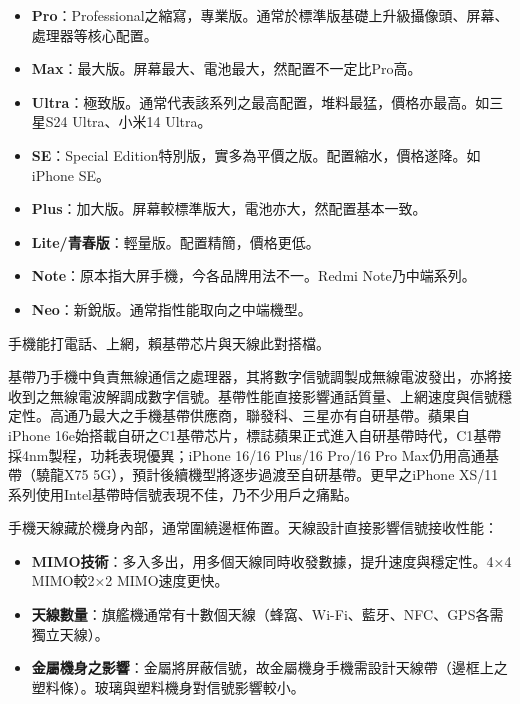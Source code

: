 
\begin{itemize}
  \item \textbf{Pro}：Professional之縮寫，專業版。通常於標準版基礎上升級攝像頭、屏幕、處理器等核心配置。
  \item \textbf{Max}：最大版。屏幕最大、電池最大，然配置不一定比Pro高。
  \item \textbf{Ultra}：極致版。通常代表該系列之最高配置，堆料最猛，價格亦最高。如三星S24 Ultra、小米14 Ultra。
  \item \textbf{SE}：Special Edition特別版，實多為平價之版。配置縮水，價格遂降。如iPhone SE。
  \item \textbf{Plus}：加大版。屏幕較標準版大，電池亦大，然配置基本一致。
  \item \textbf{Lite/青春版}：輕量版。配置精簡，價格更低。
  \item \textbf{Note}：原本指大屏手機，今各品牌用法不一。Redmi Note乃中端系列。
  \item \textbf{Neo}：新銳版。通常指性能取向之中端機型。
\end{itemize}


手機能打電話、上網，賴基帶芯片與天線此對搭檔。


基帶乃手機中負責無線通信之處理器，其將數字信號調製成無線電波發出，亦將接收到之無線電波解調成數字信號。基帶性能直接影響通話質量、上網速度與信號穩定性。高通乃最大之手機基帶供應商，聯發科、三星亦有自研基帶。蘋果自iPhone 16e始搭載自研之C1基帶芯片，標誌蘋果正式進入自研基帶時代，C1基帶採4nm製程，功耗表現優異；iPhone 16/16 Plus/16 Pro/16 Pro Max仍用高通基帶（驍龍X75 5G），預計後續機型將逐步過渡至自研基帶。更早之iPhone XS/11系列使用Intel基帶時信號表現不佳，乃不少用戶之痛點。


手機天線藏於機身內部，通常圍繞邊框佈置。天線設計直接影響信號接收性能：

\begin{itemize}
  \item \textbf{MIMO技術}：多入多出，用多個天線同時收發數據，提升速度與穩定性。4×4 MIMO較2×2 MIMO速度更快。
  \item \textbf{天線數量}：旗艦機通常有十數個天線（蜂窩、Wi-Fi、藍牙、NFC、GPS各需獨立天線）。
  \item \textbf{金屬機身之影響}：金屬將屏蔽信號，故金屬機身手機需設計天線帶（邊框上之塑料條）。玻璃與塑料機身對信號影響較小。
\end{itemize}

